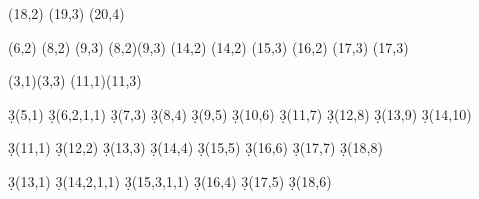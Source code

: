 \begin{sseqpage}
\etaclass(18,2)
\etaclass(19,3)
\etaclass(20,4)

\class["{\beta_{2/2}}" {below=0.05em}](6,2)
\class["\beta_2" {below=0.2em}](8,2)
\class["\nu^3" {below=0.2em}](9,3) \structline(8,2)(9,3)
\class["{\beta_{4/4}}" {below=0.2em}](14,2)
\class["\beta_3" {below right=0.2em}](14,2) \etaclass(15,3)
\class["{\beta_{4/3}}" {below=0.2em}](16,2) \etaclass(17,3)
\class["{\nu \beta_3}" {below=0.2em}](17,3)


(3,1)(3,3)
(11,1)(11,3)

\d3(5,1)
\d3(6,2,1,1)
\d3(7,3)
\d3(8,4)
\d3(9,5)
\d3(10,6)
\d3(11,7)
\d3(12,8)
\d3(13,9)
\d3(14,10)

\d3(11,1)
\d3(12,2)
\d3(13,3)
\d3(14,4)
\d3(15,5)
\d3(16,6)
\d3(17,7)
\d3(18,8)

\d3(13,1)
\d3(14,2,1,1)
\d3(15,3,1,1)
\d3(16,4)
\d3(17,5)
\d3(18,6)

\end{sseqpage}
